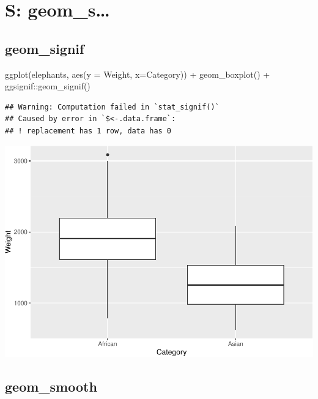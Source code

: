 \documentclass[
]{book}
\newenvironment{Shaded}{\begin{snugshade}}{\end{snugshade}}
\newcommand{\AttributeTok}[1]{\textcolor[rgb]{0.77,0.63,0.00}{#1}}
\newcommand{\FunctionTok}[1]{\textcolor[rgb]{0.00,0.00,0.00}{#1}}
\newcommand{\NormalTok}[1]{#1}
\newcommand{\SpecialCharTok}[1]{\textcolor[rgb]{0.00,0.00,0.00}{#1}}
\begin{document}
\hypertarget{s-geom_s}{%
\chapter{S: geom\_s\ldots{}}\label{s-geom_s}}

\hypertarget{geom_signif}{%
\section{geom\_signif}\label{geom_signif}}

\begin{Shaded}
\begin{Highlighting}[]
\FunctionTok{ggplot}\NormalTok{(elephants, }\FunctionTok{aes}\NormalTok{(}\AttributeTok{y =}\NormalTok{ Weight, }\AttributeTok{x=}\NormalTok{Category)) }\SpecialCharTok{+} \FunctionTok{geom\_boxplot}\NormalTok{() }\SpecialCharTok{+}\NormalTok{ ggsignif}\SpecialCharTok{::}\FunctionTok{geom\_signif}\NormalTok{()}
\end{Highlighting}
\end{Shaded}

\begin{verbatim}
## Warning: Computation failed in `stat_signif()`
## Caused by error in `$<-.data.frame`:
## ! replacement has 1 row, data has 0
\end{verbatim}

\includegraphics{Data-Visualisation-geom-Encyclopedia_files/figure-latex/unnamed-chunk-46-1.pdf}

\hypertarget{geom_smooth}{%
\section{geom\_smooth}\label{geom_smooth}}
\end{document}
